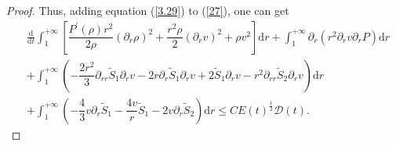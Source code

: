 \documentclass[10pt,reqno]{amsart}
\numberwithin{equation}{section}
\begin{document}
\begin{proof}
		Thus, adding equation (\ref{3.29}) to (\ref{27}),
		one can get
		\begin{equation}\label{3.30}
			\begin{aligned}
				&\frac{\mathrm{d}}{\mathrm{d} t}\int_{1}^{+\infty}\left[\dfrac{P^{\prime}(\rho)r^2}{2\rho}\left(\partial_r \rho\right)^2+\dfrac{r^2\rho}{2} (\partial_{r}v)^2+\rho v^2\right]\mathrm{d}r
				+ \int_{1}^{+\infty}\partial_{r}(r^2\partial_{r} v  \partial_r P)	\mathrm{d}r\\
				&
				+\int_{1}^{+\infty}\left(-\dfrac{2 r^2}{3} \partial_{rr}\tilde{S}_1 \partial_{r}v-2r \partial_{r}\tilde{S}_1 \partial_{r}v+2\tilde{S}_1\partial_{r}v-r^2 \partial_{rr}\tilde{S}_2\partial_{r}v\right)\mathrm{d}r\\
				&+\int_{1}^{+\infty}\left(-\dfrac{4}{3}v\partial_r \tilde{S}_1-\dfrac{4 v }{r}\tilde{S}_1- 2v\partial_{r}\tilde{S}_2\right)\mathrm{d}r
				\leq C E(t)^{\frac{1}{2}}\mathcal{D}(t).
			\end{aligned}
		\end{equation}
		

\end{proof}
\end{document}
